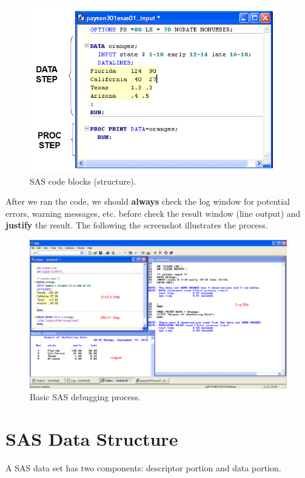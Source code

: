 \documentclass[
]{book}
\begin{document}
\begin{figure}

{\centering \includegraphics[width=0.5\linewidth]{img02/w02-SASEditorWindow} 

}

\caption{SAS code blocks (structure).}\label{fig:unnamed-chunk-10}
\end{figure}

After we ran the code, we should \textbf{always} check the log window for potential errors, warning messages, etc. before check the result window (line output) and \textbf{justify} the result. The following the screenshot illustrates the process.

\begin{figure}

{\centering \includegraphics[width=0.9\linewidth]{img02/w02-3Windows} 

}

\caption{Basic SAS debugging process.}\label{fig:unnamed-chunk-11}
\end{figure}

\hypertarget{sas-data-structure}{%
\section{SAS Data Structure}\label{sas-data-structure}}

A SAS data set has two components: descriptor portion and data portion.
\end{document}
